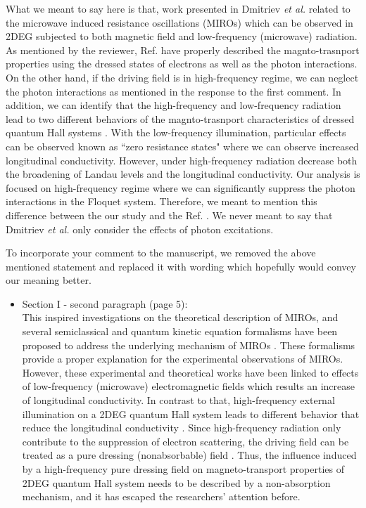 \documentclass{article}
\begin{document}
What we meant to say here is that, work presented in Dmitriev \textit{et al.} \cite{dmitriev09} related to the microwave induced resistance oscillations (MIROs) which can be observed in 2DEG subjected to both magnetic field and low-frequency (microwave) radiation. As mentioned by the reviewer, Ref. \cite{dmitriev09} have properly described the magnto-trasnport properties using the dressed states of electrons as well as the photon interactions. On the other hand, if the driving field is in high-frequency regime, we can neglect the photon interactions as mentioned in the response to the first comment. In addition, we can identify that the high-frequency and low-frequency radiation lead to two different behaviors of the magnto-trasnport characteristics of dressed quantum Hall systems \cite{dini16}. With the low-frequency illumination, particular effects can be observed known as ``zero resistance states" where we can observe increased longitudinal conductivity. However, under high-frequency radiation decrease both the broadening of Landau levels and the longitudinal conductivity.
Our analysis is focused on high-frequency regime where we can significantly suppress the photon interactions in the Floquet system. Therefore, we meant to mention this difference between the our study and the Ref. \cite{dmitriev09}. We never meant to say that Dmitriev \textit{et al.} \cite{dmitriev09} only consider the effects of photon excitations.

To incorporate your comment to the manuscript, we removed the above mentioned statement and replaced it with wording which hopefully would convey our meaning better.

\begin{itemize}
  \item Section I - second paragraph (page 5):\\
  {\color{Red}
  This inspired investigations on the theoretical description of MIROs, and several semiclassical and quantum kinetic equation formalisms have been proposed to address the underlying mechanism of MIROs \cite{durst03,dmitriev03,dmitriev05,dmitriev09}. These formalisms provide a proper explanation for the experimental observations of MIROs. However, these experimental and theoretical works have been linked to effects of low-frequency (microwave) electromagnetic fields which results an increase of longitudinal conductivity.
  In contrast to that, high-frequency external illumination on a 2DEG quantum Hall system leads to different behavior that reduce the longitudinal conductivity \cite{dini16}.
  Since high-frequency radiation only contribute to the suppression of electron scattering, the driving field can be treated as a pure dressing (nonabsorbable) field \cite{dini16}.
  Thus, the influence induced by a high-frequency pure dressing field on
  magneto-transport properties of 2DEG quantum Hall system needs to be described by a non-absorption mechanism, and it has escaped the researchers’ attention before.
  }
\end{itemize}
\end{document}
